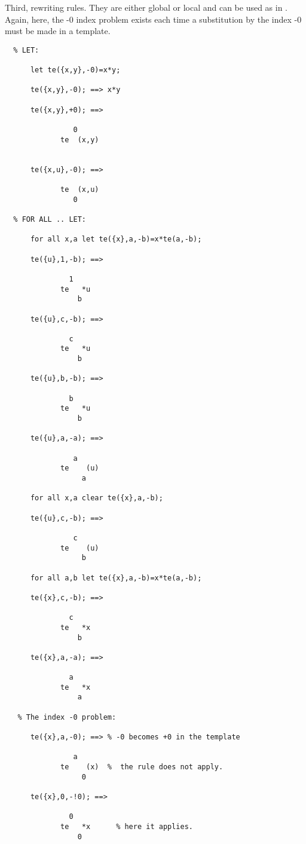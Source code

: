 Third, rewriting rules. They are either global or local and
can be used as in \REDUCE.
Again, here,  the -0 index problem exists each time a substitution
by the index -0 must be made in a template.
\begin{verbatim}
  % LET:

      let te({x,y},-0)=x*y;

      te({x,y},-0); ==> x*y

      te({x,y},+0); ==>

                0
             te  (x,y)


      te({x,u},-0); ==>

             te  (x,u)
                0

  % FOR ALL .. LET:

      for all x,a let te({x},a,-b)=x*te(a,-b);

      te({u},1,-b); ==>

               1
             te   *u
                 b

      te({u},c,-b); ==>

               c
             te   *u
                 b

      te({u},b,-b); ==>

               b
             te   *u
                 b

      te({u},a,-a); ==>

                a
             te    (u)
                  a

      for all x,a clear te({x},a,-b);

      te({u},c,-b); ==>

                c
             te    (u)
                  b

      for all a,b let te({x},a,-b)=x*te(a,-b);

      te({x},c,-b); ==>

               c
             te   *x
                 b

      te({x},a,-a); ==>

               a
             te   *x
                 a

   % The index -0 problem:

      te({x},a,-0); ==> % -0 becomes +0 in the template

                a
             te    (x)  %  the rule does not apply.
                  0

      te({x},0,-!0); ==>

               0
             te   *x      % here it applies.
                 0
\end{verbatim}
